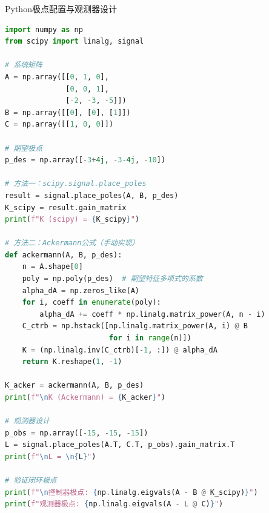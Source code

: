 \begin{mycode}{Python极点配置与观测器设计}
\begin{lstlisting}[language=Python]
import numpy as np
from scipy import linalg, signal

# 系统矩阵
A = np.array([[0, 1, 0],
              [0, 0, 1],
              [-2, -3, -5]])
B = np.array([[0], [0], [1]])
C = np.array([[1, 0, 0]])

# 期望极点
p_des = np.array([-3+4j, -3-4j, -10])

# 方法一：scipy.signal.place_poles
result = signal.place_poles(A, B, p_des)
K_scipy = result.gain_matrix
print(f"K (scipy) = {K_scipy}")

# 方法二：Ackermann公式（手动实现）
def ackermann(A, B, p_des):
    n = A.shape[0]
    poly = np.poly(p_des)  # 期望特征多项式的系数
    alpha_dA = np.zeros_like(A)
    for i, coeff in enumerate(poly):
        alpha_dA += coeff * np.linalg.matrix_power(A, n - i)
    C_ctrb = np.hstack([np.linalg.matrix_power(A, i) @ B
                        for i in range(n)])
    K = (np.linalg.inv(C_ctrb)[-1, :]) @ alpha_dA
    return K.reshape(1, -1)

K_acker = ackermann(A, B, p_des)
print(f"\nK (Ackermann) = {K_acker}")

# 观测器设计
p_obs = np.array([-15, -15, -15])
L = signal.place_poles(A.T, C.T, p_obs).gain_matrix.T
print(f"\nL = \n{L}")

# 验证闭环极点
print(f"\n控制器极点: {np.linalg.eigvals(A - B @ K_scipy)}")
print(f"观测器极点: {np.linalg.eigvals(A - L @ C)}")
\end{lstlisting}
\end{mycode}

